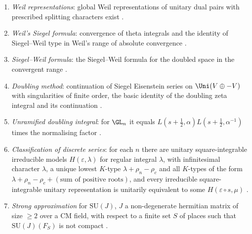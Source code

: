 \begin{enumerate}[label=(P\arabic*),leftmargin=*]
pair of unitary groups and a representation of the pair with a vacuum vector $s$ generating the Heisenberg action,
the vectors fixed by the hyperspecial subgroup of one member lie in the span of the translates of $s$ by the other
member \cite{Howe1979}.
\item\label{pf:open0a:P7} \emph{Weil representations}: global Weil representations of unitary dual pairs with
prescribed splitting characters exist \cite{Kudla1994}.
\item\label{pf:open0a:P8} \emph{Weil's Siegel formula}: convergence of theta integrals and the identity of
Siegel--Weil type in Weil's range of absolute convergence \cite{Weil1965}.
\item\label{pf:open0a:P9} \emph{Siegel--Weil formula}: the Siegel--Weil formula for the doubled space in the
convergent range \cite{Weil1965,KudlaRallis1988,Ichino2004}.
\item\label{pf:open0a:P10} \emph{Doubling method}: continuation of Siegel Eisenstein series on $\Uni(V\oplus-V)$
with singularities of finite order, the basic identity of the doubling zeta integral and its continuation
\cite{GelbartPiatetskiShapiroRallis1987,PiatetskiShapiroRallis1987}.
\item\label{pf:open0a:P11} \emph{Unramified doubling integral}: for $\GL_n$ it equals
$L(s+\frac12,\alpha)L(s+\frac12,\alpha^{-1})$ times the normalising factor \cite{GelbartPiatetskiShapiroRallis1987}.
\item\label{pf:open0a:P12} \emph{Classification of discrete series}: for each $n$ there are unitary
square-integrable irreducible models $H(\varepsilon,\lambda)$ for regular integral $\lambda$, with infinitesimal
character $\lambda$, a unique lowest $K$-type $\lambda+\rho_n-\rho_c$ and all $K$-types of the form
$\lambda+\rho_n-\rho_c+(\text{sum of positive roots})$, and every irreducible square-integrable unitary
representation is unitarily equivalent to some $H(\varepsilon\circ s,\mu)$ \cite{HarishChandra1966,Knapp1986}.
\item\label{pf:open0a:P13} \emph{Strong approximation} for $\mathrm{SU}(J)$, $J$ a non-degenerate hermitian matrix
of size $\ge2$ over a CM field, with respect to a finite set $S$ of places such that $\mathrm{SU}(J)(F_S)$ is not
compact \cite{Kneser1966,PlatonovRapinchuk1994}.
\end{enumerate}

